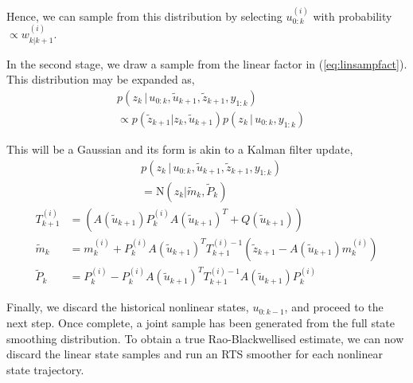 \documentclass[twocolumn]{autart}    %
\begin{document}
Hence, we can sample from this distribution by selecting $u_{0:k}^{(i)}$ with probability $\propto w^{(i)}_{k|k+1}$.

In the second stage, we draw a sample from the linear factor in (\ref{eq:linsampfact}). This distribution may be expanded as,
%
\begin{equation}
\begin{split}
  &p(z_k\,|\, u_{0:k}, \tilde{u}_{k+1}, \tilde{z}_{k+1},y_{1:k}) \\
  &\propto p(\tilde{z}_{k+1} | z_k, \tilde{u}_{k+1}) p(z_k\,|\, u_{0:k}, y_{1:k})
\end{split}
\end{equation}

This will be a Gaussian and its form is akin to a Kalman filter update,
%
\begin{equation}
\begin{split}
  &p(z_k\,|\, u_{0:k}, \tilde{u}_{k+1}, \tilde{z}_{k+1},y_{1:k}) \\
  &= \mathrm{N}( z_k | \tilde{m}_k , \tilde{P}_k )
\end{split}
\end{equation}
%
\begin{equation}
\begin{split}
  T_{k+1}^{(i)} &= ( A(\tilde{u}_{k+1}) P_k^{(i)} A(\tilde{u}_{k+1})^T + Q(\tilde{u}_{k+1}) ) \\
  \tilde{m}_k &= m_k^{(i)} + P_k^{(i)} A(\tilde{u}_{k+1})^T T_{k+1}^{(i)-1} (\tilde{z}_{k+1} - A(\tilde{u}_{k+1}) m_k^{(i)} ) \\
  \tilde{P}_k &= P_k^{(i)} - P_k^{(i)} A(\tilde{u}_{k+1})^T T_{k+1}^{(i)-1} A(\tilde{u}_{k+1}) P_k^{(i)}
\end{split}
\label{eq:linsamplinupd}
\end{equation}

Finally, we discard the historical nonlinear states, $u_{0:k-1}$, and proceed to the next step. Once complete, a joint sample has been generated from the full state smoothing distribution. To obtain a true Rao-Blackwellised estimate, we can now discard the linear state samples and run an RTS smoother for each nonlinear state trajectory.
\end{document}

